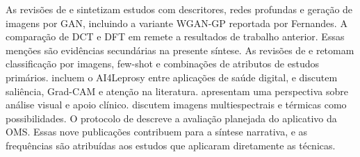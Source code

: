 As revisões de  e  sintetizam
estudos com descritores, redes profundas e geração de imagens por GAN, incluindo
a variante WGAN-GP reportada por Fernandes. A comparação de DCT e DFT em
 remete a resultados de trabalho anterior. Essas menções
são evidências secundárias na presente síntese. As revisões de
 e  retomam classificação por imagens,
few-shot e combinações de atributos de estudos primários. 
incluem o AI4Leprosy entre aplicações de saúde digital, e
 discutem saliência, Grad-CAM e atenção na literatura.
 apresentam uma perspectiva sobre análise visual e apoio
clínico.  discutem imagens multiespectrais e térmicas como
possibilidades. O protocolo de  descreve a avaliação planejada
do aplicativo da OMS. Essas nove publicações contribuem para a síntese narrativa,
e as frequências são atribuídas aos estudos que aplicaram diretamente as técnicas.

